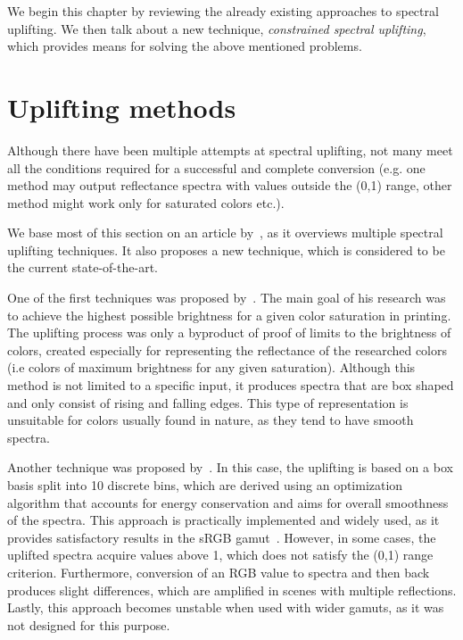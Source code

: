 We begin this chapter by reviewing the already existing approaches to spectral uplifting. We then talk about a new technique, \emph{constrained spectral uplifting}, which provides means for solving the above mentioned problems.

\section{Uplifting methods} \label{sec:upliftingMethods}

Although there have been multiple attempts at spectral uplifting, not many meet all the conditions required for a successful and complete conversion (e.g. one method may output reflectance spectra with values outside the (0,1) range, other method might work only for saturated colors etc.).

We base most of this section on an article by~\citet{upsamplingTechniques}, as it overviews multiple spectral uplifting techniques. It also proposes a new technique, which is considered to be the current state-of-the-art.

One of the first techniques was proposed by~\citet{upsamplingMacAdam}. The main goal of his research was to achieve the highest possible brightness for a given color saturation in printing. The uplifting process was only a byproduct of proof of limits to the brightness of colors, created especially for representing the reflectance of the researched colors (i.e colors of maximum brightness for any given saturation). Although this method is not limited to a specific input, it produces spectra that are box shaped and only consist of rising and falling edges. This type of representation is unsuitable for colors usually found in nature, as they tend to have smooth spectra.

Another technique was proposed by~\citet{upsamplingSmits}. In this case, the uplifting is based on a box basis split into 10 discrete bins, which are derived using an optimization algorithm that accounts for energy conservation and aims for overall smoothness of the spectra. This approach is practically implemented and widely used, as it provides satisfactory results in the sRGB gamut~\cite{upsamplingJakobHanika}. However, in some cases, the uplifted spectra acquire values above 1, which does not satisfy the (0,1) range criterion. Furthermore, conversion of an RGB value to spectra and then back produces slight differences, which are amplified in scenes with multiple reflections. Lastly, this approach becomes unstable when used with wider gamuts, as it was not designed for this purpose.

